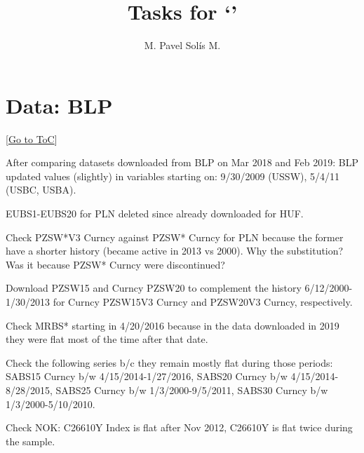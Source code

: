 \documentclass[12pt]{article}
\newcommand{\gototoc}{\vspace{-1.8cm} \null\hfill [\hyperlink{toc}{Go to ToC}] \newline}
\begin{document}
	\title{Tasks for `'}
	\author{M. Pavel Solís M.}
	\date{}
	\maketitle
	\hypertarget{toc}{}								 %
	\tableofcontents
	\vspace{2.5\bigskipamount}
	

\section{Data: BLP}
\gototoc
\begin{todolist}
	\item After comparing datasets downloaded from BLP on Mar 2018 and Feb 2019: BLP updated values (slightly) in variables starting on: 9/30/2009 (USSW), 5/4/11 (USBC, USBA).
	\item EUBS1-EUBS20 for PLN deleted since already downloaded for HUF.
	\item Check PZSW*V3 Curncy against PZSW* Curncy for PLN because the former have a shorter history (became active in 2013 vs 2000). Why the substitution? Was it because PZSW* Curncy were discontinued?
	\item Download PZSW15 and Curncy PZSW20 to complement the history 6/12/2000-1/30/2013 for Curncy PZSW15V3 Curncy and PZSW20V3 Curncy, respectively.
	\item Check MRBS* starting in 4/20/2016 because in the data downloaded in 2019 they were flat most of the time after that date.
	\item Check the following series b/c they remain mostly flat during those periods: SABS15 Curncy b/w 4/15/2014-1/27/2016, SABS20 Curncy b/w 4/15/2014-8/28/2015, SABS25 Curncy b/w 1/3/2000-9/5/2011, SABS30 Curncy b/w 1/3/2000-5/10/2010.
	\item Check NOK: C26610Y Index is flat after Nov 2012, C26610Y is flat twice during the sample.
\end{todolist}
\end{document}
